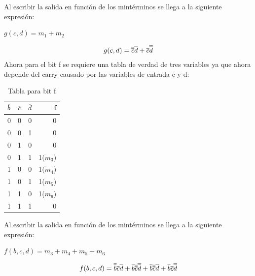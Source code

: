 \newline Al escribir la salida en función de los mintérminos se llega a la siguiente expresión:
\newline \centerline{$g(c,d)=m_{1}+m_{2}$}
\begin{equation}
	\centerline{$g(c,d)=\overline{\overline{c}}\overline{d}+\overline{c}\overline{\overline{d}}$}
\end{equation}
\newline Ahora para el bit f se requiere una tabla de verdad de tres variables ya que ahora depende del carry causado por las variables de entrada c y d:
\begin{table}[h!]
	\begin{center}
		\caption{Tabla para bit f}
		\begin{tabular}{l|c|c|r}
			\textbf{$\overline{b}$} & \textbf{$\overline{c}$} & \textbf{$\overline{d}$} & \textbf{f} \\
			\hline
			0                       & 0                       & 0                       & 0          \\
			0                       & 0                       & 1                       & 0          \\	
			0                       & 1                       & 0                       & 0          \\
			0                       & 1                       & 1                       & 1($m_{3}$) \\
			1                       & 0                       & 0                       & 1($m_{4}$) \\
			1                       & 0                       & 1                       & 1($m_{5}$) \\	
			1                       & 1                       & 0                       & 1($m_{6}$) \\
			1                       & 1                       & 1                       & 0          \\				
		\end{tabular}
	\end{center}
\end{table}
\newline Al escribir la salida en función de los mintérminos se llega a la siguiente expresión:
\newline \centerline{$f(b,c,d)=m_{3}+m_{4}+m_{5}+m_{6}$}
\begin{equation}
	\centerline{$f(b,c,d)=\overline{\overline{b}}\overline{c}\overline{d}+\overline{b}\overline{\overline{c}}\overline{\overline{d}}+\overline{b}\overline{\overline{c}}\overline{d}+\overline{b}\overline{c}\overline{\overline{d}}$}
\end{equation}
